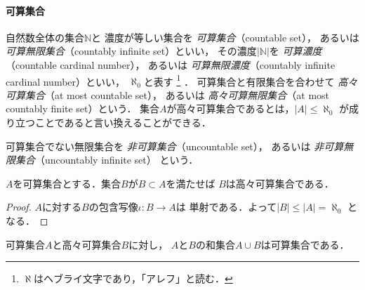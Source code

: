   \paragraph{可算集合}
   自然数全体の集合$\mathbb{N}$と
   濃度が等しい集合を
   \emph{可算集合}（countable set），
   あるいは
   \emph{可算無限集合}（countably infinite set）といい，
   その濃度$\lvert \mathbb{N} \rvert$を
   \emph{可算濃度}（countable cardinal number），
   あるいは
   \emph{可算無限濃度}（countably infinite cardinal number）といい，
   $\aleph _0$と表す
   \footnote{$\aleph$はヘブライ文字であり，「アレフ」と読む．
   }
   ．
   可算集合と有限集合を合わせて
   \emph{高々可算集合}（at most countable set），
   あるいは
   \emph{高々可算無限集合}（at most countably finite set）という．
   集合$A$が高々可算集合であるとは，$\lvert A \rvert \leq \aleph _0$
   が成り立つことであると言い換えることができる．

   可算集合でない無限集合を
   \emph{非可算集合}（uncountable set），
   あるいは
   \emph{非可算無限集合}（uncountably infinite set）
   という．


   \begin{thm} \label{thm:subsetcount}
     $A$を可算集合とする．集合$B$が$B \subset A$を満たせば
     $B$は高々可算集合である．
   \end{thm}

   \begin{proof}
     $A$に対する$B$の包含写像$\iota : B \longrightarrow A$は
     単射である．よって$\lvert B \rvert \leq \lvert A \rvert = \aleph _0$
     となる．
   \end{proof}

   \begin{thm} \label{thm:unioncount}
     可算集合$A$と高々可算集合$B$に対し，
     $A$と$B$の和集合$A \cup B$は可算集合である．
   \end{thm}

